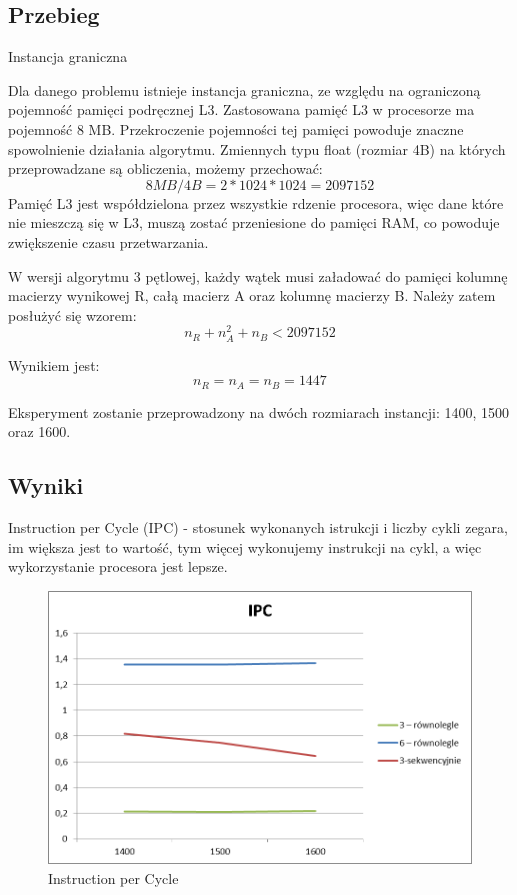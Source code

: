 \documentclass{article}
\begin{document}
\subsection{Przebieg}
Instancja graniczna

Dla danego problemu istnieje instancja graniczna, ze względu na ograniczoną pojemność pamięci podręcznej L3. Zastosowana pamięć L3 w procesorze ma pojemność 8 MB. Przekroczenie pojemności tej pamięci powoduje znaczne spowolnienie działania algorytmu. Zmiennych typu float (rozmiar 4B) na których przeprowadzane są obliczenia, możemy przechować: 
\[ 8MB/4B = 2 * 1024 * 1024 = 2097152 \]
Pamięć L3 jest współdzielona przez wszystkie rdzenie procesora, więc dane które nie mieszczą się w L3, muszą zostać przeniesione do pamięci RAM, co powoduje zwiększenie czasu przetwarzania.

W wersji algorytmu 3 pętlowej, każdy wątek musi załadować do pamięci kolumnę macierzy wynikowej R, całą macierz A oraz kolumnę macierzy B.
Należy zatem posłużyć się wzorem:
\[ n_R + n_A^2 + n_B < 2097152 \]

Wynikiem jest:
\[ n_R = n_A = n_B = 1447\]

Eksperyment zostanie przeprowadzony na dwóch rozmiarach instancji: 1400,  1500 oraz 1600.


\subsection{Wyniki}
Instruction per Cycle (IPC) - stosunek wykonanych istrukcji i liczby cykli zegara, im większa jest to wartość, tym więcej wykonujemy instrukcji na cykl, a więc wykorzystanie procesora jest lepsze.

\begin{figure}[H]
	\centering
	\includegraphics[bb=0 0 1280 960]{./images/wykresy/IPC.png}
	\caption{Instruction per Cycle}
	\label{fig:3medium}
\end{figure}
\end{document}
